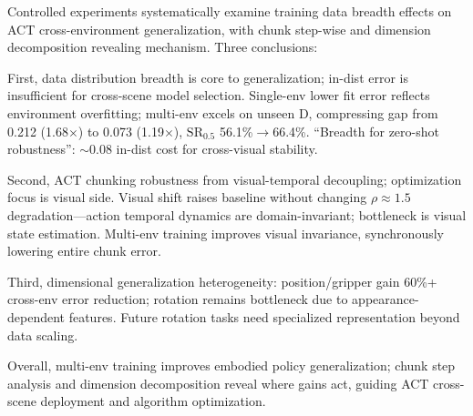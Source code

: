 \documentclass[10pt,twocolumn,letterpaper]{article}
\begin{document}
Controlled experiments systematically examine training data breadth effects on ACT cross-environment generalization, with chunk step-wise and dimension decomposition revealing mechanism. Three conclusions:

First, data distribution breadth is core to generalization; in-dist error is insufficient for cross-scene model selection. Single-env lower fit error reflects environment overfitting; multi-env excels on unseen D, compressing gap from 0.212 (1.68$\times$) to 0.073 (1.19$\times$), $\mathrm{SR}_{0.5}$ 56.1\%$\to$66.4\%. ``Breadth for zero-shot robustness'': $\sim$0.08 in-dist cost for cross-visual stability.

Second, ACT chunking robustness from visual-temporal decoupling; optimization focus is visual side. Visual shift raises baseline without changing $\rho\approx1.5$ degradation---action temporal dynamics are domain-invariant; bottleneck is visual state estimation. Multi-env training improves visual invariance, synchronously lowering entire chunk error.

Third, dimensional generalization heterogeneity: position/gripper gain 60\%+ cross-env error reduction; rotation remains bottleneck due to appearance-dependent features. Future rotation tasks need specialized representation beyond data scaling.

Overall, multi-env training improves embodied policy generalization; chunk step analysis and dimension decomposition reveal where gains act, guiding ACT cross-scene deployment and algorithm optimization.
\end{document}
